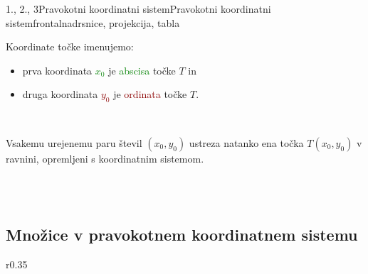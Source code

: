 \begin{priprava}{1., 2., 3}{}{Pravokotni koordinatni sistem}{Pravokotni koordinatni sistem}{frontalna}{drsnice, projekcija, tabla}
    ~

    Koordinate točke imenujemo:
        \begin{itemize}
            \item prva koordinata \textcolor{green}{$x_0$} je \textcolor{green}{abscisa} točke $T$ in
            \item druga koordinata \textcolor{darkred}{$y_0$} je \textcolor{darkred}{ordinata} točke $T$.
        \end{itemize}

    

        ~

        Vsakemu urejenemu paru števil $(x_0,y_0)$ ustreza natanko ena točka $T(x_0,y_0)$ v ravnini, opremljeni s koordinatnim sistemom.



        ~~\\~~




\subsection*{Množice v pravokotnem koordinatnem sistemu}



        \begin{wrapfigure}{r}{0.35\textwidth}
\end{wrapfigure}
\end{priprava}
